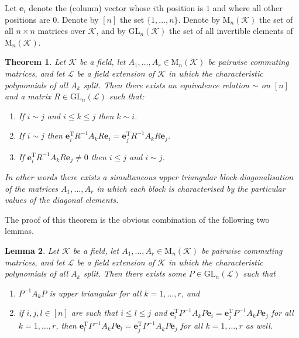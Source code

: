 \documentclass[12pt]{article}
\newtheorem{theorem}{Theorem}
\newtheorem{lemma}[theorem]{Lemma}
\newcommand{\mc}{\mathcal}
\newcommand{\vek}{\mathbf}
\newcommand{\Mat}{\mathrm{M}}
\newcommand{\GL}{\mathrm{GL}}
\newcommand{\Trans}[1]{#1^{\mathrm{T}}\!}
\begin{document}
Let $\vek{e}_i$ denote the (column) vector whose $i$th position is $1$ 
and where all other positions are $0$. Denote by $[n]$ the set 
$\{1,\dotsc,n\}$. Denote by $\Mat_n(\mc{K})$ the set of all $n \times 
n$ matrices over $\mc{K}$, and by $\GL_n(\mc{K})$ the set of all 
invertible elements of $\Mat_n(\mc{K})$.

\begin{theorem}
  Let $\mc{K}$ be a field, let \(A_1,\dotsc,A_r \in \Mat_n(\mc{K})\) 
  be pairwise commuting matrices, and let $\mc{L}$ be a field extension 
  of $\mc{K}$ in which the characteristic polynomials of all $A_k$ 
  split. Then there exists an equivalence relation $\sim$ on $[n]$ and 
  a matrix \(R \in \GL_n(\mc{L})\) such that:
  \begin{enumerate}
    \item
      If \(i \sim j\) and \(i \leqslant k \leqslant j\) then 
      \(k \sim i\).
    \item
      If \(i \sim j\) then \(\Trans{\vek{e}_i} R^{-1} A_k R 
      \vek{e}_i = \Trans{\vek{e}_j} R^{-1} A_k R \vek{e}_j\).
    \item
      If \(\Trans{\vek{e}_i} R^{-1} A_k R \vek{e}_j \neq 0\) then 
      \(i \leqslant j\) and \(i \sim j\).
  \end{enumerate}
  In other words there exists a simultaneous upper triangular 
  block-diagonalisation of the matrices $A_1,\dotsc,A_r$ in which each 
  block is characterised by the particular values of the diagonal 
  elements.
\end{theorem}

The proof of this theorem is the obvious combination of the following 
two lemmas.

\begin{lemma} 
  Let $\mc{K}$ be a field, let \(A_1,\dotsc,A_r \in \Mat_n(\mc{K})\) 
  be pairwise commuting matrices, and let $\mc{L}$ be a field extension 
  of $\mc{K}$ in which the characteristic polynomials of all $A_k$ 
  split. Then there exists some \(P \in \GL_n(\mc{L})\) such that
  \begin{enumerate}
    \item
      \(P^{-1} A_k P\) is upper triangular for all \(k=1,\dotsc,r\),
      and
    \item
      if \(i,j,l \in [n]\) are such that \(i \leqslant l \leqslant j\) 
      and \(\Trans{\vek{e}_i} P^{-1} A_k P \vek{e}_i = 
      \Trans{\vek{e}_j} P^{-1} A_k P \vek{e}_j\) for all 
      \(k=1,\dotsc,r\), then \(\Trans{\vek{e}_l} P^{-1} A_k P 
      \vek{e}_l = \Trans{\vek{e}_j} P^{-1} A_k P \vek{e}_j\) 
      for all \(k=1,\dotsc,r\) as well.
  \end{enumerate}
\end{lemma}
\end{document}
